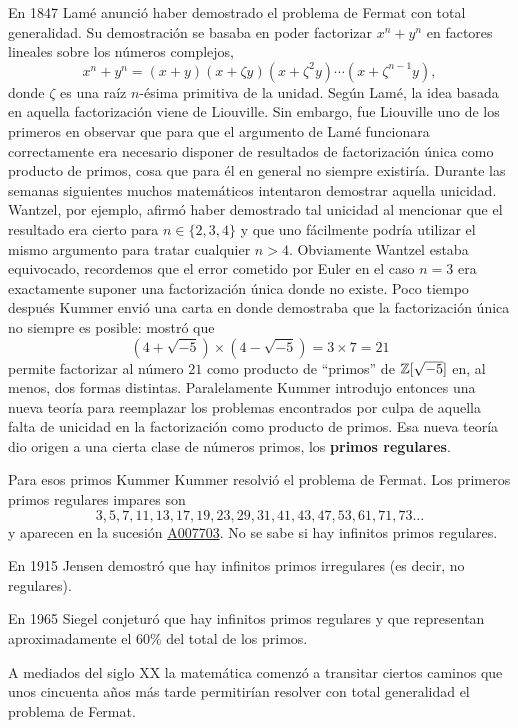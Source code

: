 En 1847 Lamé anunció haber demostrado el problema de Fermat con total
generalidad. Su demostración se basaba en poder factorizar $x^n+y^n$ en
factores lineales sobre los números complejos, 
\[
	x^n+y^n=(x+y)(x+\zeta y)(x+\zeta^2y)\cdots (x+\zeta^{n-1}y),
\]
donde $\zeta$ es una raíz $n$-ésima primitiva de la unidad. 
Según Lamé, la idea basada en aquella 
factorización viene de Liouville. Sin embargo, fue Liouville uno de los
primeros en observar que para que el argumento de Lamé funcionara correctamente
era necesario disponer de resultados de factorización única como producto de
primos, cosa que para él en general no siempre existiría. Durante las semanas
siguientes muchos matemáticos intentaron demostrar aquella unicidad. Wantzel,
por ejemplo, afirmó haber demostrado tal unicidad al mencionar que el resultado
era cierto para $n\in\{2,3,4\}$ y que uno fácilmente podría utilizar el mismo
argumento para tratar cualquier $n>4$. Obviamente Wantzel estaba equivocado,
recordemos que el error cometido por Euler en el caso $n=3$ era exactamente
suponer una factorización única donde no existe. Poco tiempo después Kummer
envió una carta en donde demostraba que la factorización
única no siempre es posible: mostró que
\[
	(4+\sqrt{-5})\times (4-\sqrt{-5})=3\times 7=21
\]
permite factorizar al número $21$ como producto de ``primos'' de
$\mathbb{Z}[\sqrt{-5}]$ en, al menos, dos formas distintas. Paralelamente Kummer
introdujo entonces una nueva teoría para reemplazar los problemas encontrados
por culpa de aquella falta de unicidad en la factorización como producto de
primos. Esa nueva teoría dio origen a una cierta clase de números primos, los
\textbf{primos regulares}. 

Para esos primos Kummer Kummer resolvió el problema de Fermat.  Los primeros
primos regulares impares son
\[
    3, 5, 7, 11, 13, 17, 19, 23, 29, 31, 41, 43, 47, 53, 61, 71, 73\dots
\]
y aparecen en la sucesión \href{https://oeis.org/A007703}{A007703}. No se sabe si hay infinitos primos
regulares. 

En 1915 Jensen demostró que hay infinitos primos irregulares (es
decir, no regulares).  

En 1965 Siegel conjeturó que hay infinitos primos
regulares y que representan aproximadamente el 60\% del total de los primos.

A mediados del siglo XX la matemática comenzó a transitar ciertos caminos que
unos cincuenta años más tarde permitirían resolver con total generalidad el
problema de Fermat. 

